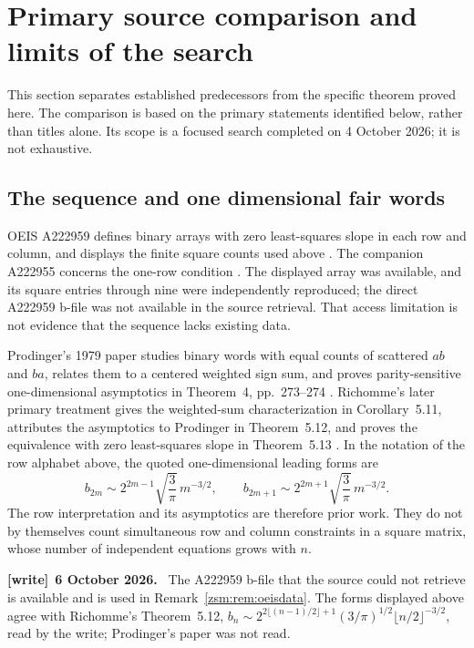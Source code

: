 \documentclass[11pt]{article}
\theoremstyle{definition}\newtheorem{definition}[theorem]{Definition}
\theoremstyle{remark}\newtheorem{remark}[theorem]{Remark}
\newenvironment{writenote}[1][]{\par\smallskip\begingroup\small
 \noindent\textbf{[write]}\if\relax\detokenize{#1}\relax\else~\textbf{#1.}\fi\ }%
 {\par\endgroup\smallskip}
\begin{document}
\section{Primary source comparison and limits of the search}\label{zsm:sec:literature}
This section separates established predecessors from the specific theorem
proved here. The comparison is based on the primary statements identified
below, rather than titles alone. Its scope is a focused search completed on
4 October 2026; it is not exhaustive.

\subsection{The sequence and one dimensional fair words}
OEIS A222959 defines binary arrays with zero least-squares slope in each row
and column, and displays the finite square counts used above
\cite{oeis959}. The companion A222955 concerns the one-row condition
\cite{oeis955}. The displayed array was available, and its square entries
through nine were independently reproduced; the direct A222959 b-file was
not available in the source retrieval. That access limitation is not evidence
that the sequence lacks existing data.

Prodinger's 1979 paper studies binary words with equal counts of scattered
$ab$ and $ba$, relates them to a centered weighted sign sum, and proves
parity-sensitive one-dimensional asymptotics in Theorem~4, pp.~273--274
\cite{prodinger}. Richomme's later primary treatment gives the weighted-sum
characterization in Corollary~5.11, attributes the asymptotics to Prodinger in
Theorem~5.12, and proves the equivalence with zero least-squares slope in
Theorem~5.13 \cite{richomme}. In the notation of the row alphabet above, the
quoted one-dimensional leading forms are
\[
 b_{2m}\sim2^{2m-1}\sqrt{\frac3\pi}\,m^{-3/2},\qquad
 b_{2m+1}\sim2^{2m+1}\sqrt{\frac3\pi}\,m^{-3/2}.
\]
The row interpretation and its asymptotics are therefore prior work. They do
not by themselves count simultaneous row and column constraints in a square
matrix, whose number of independent equations grows with $n$.

\begin{writenote}[6 October 2026]
The A222959 b-file that the source could not retrieve is available and is
used in Remark~\ref{zsm:rem:oeisdata}. The forms displayed above agree with
Richomme's Theorem~5.12,
$b_n\sim2^{2\lfloor(n-1)/2\rfloor+1}(3/\pi)^{1/2}\lfloor n/2\rfloor^{-3/2}$,
read by the write; Prodinger's paper was not read.
\end{writenote}
\end{document}
